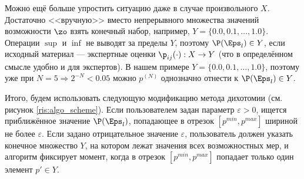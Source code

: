 
Можно ещё больше упростить ситуацию даже в случае произвольного $X$. Достаточно <<вручную>> вместо непрерывного множества значений возможности $\zo$ взять конечный набор, например, $Y = \{0.0, 0.1, \ldots, 1.0\}$. Операции $\sup$ и $\inf$ не выводят за пределы $Y$, поэтому $\P(\Eps_l) \in Y$, если исходный материал --- экспертные оценки $\p_{ij}(\cdot): X \rightarrow Y$ (что в определённом смысле удобно и для экспертов). В нашем примере $Y = \{0.0, 0.1, \ldots, 1.0\}$, поэтому уже при $N = 5 \Rightarrow 2^{-N} < 0.05$ можно $p^{(N)}$ однозначно отнести к $\P(\Eps_l) \in Y$.

Итого, будем использовать следующую модификацию метода дихотомии (см. рисунок \ref{ris:algo_scheme}). Если пользователем задан параметр $\varepsilon > 0$, ищется приближённое значение $\P(\Eps_l)$, попадающее в отрезок $[p^{min}, p^{max}]$ шириной не более $\varepsilon$. Если задано отрицательное значение $\varepsilon$, пользователь должен указать конечное множество $Y$, на котором лежат значения всех возможностных мер, и алгоритм фиксирует момент, когда в отрезок $[p^{min}, p^{max}]$ попадает только один элемент $p' \in Y$. %

